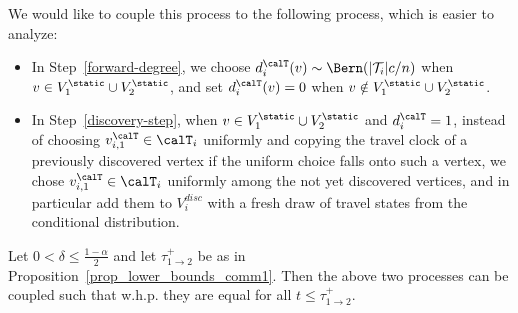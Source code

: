 \documentclass[11pt]{article}
\begin{document}
We would like to couple this process to the following process, which is easier to analyze:
\begin{itemize}
    \item In Step~\ref{forward-degree}, we choose
    $d_i^\calT(v)\sim \Bern(|\mathcal T_i|c/n)$ when $v\in V_1^\static\cup V_2^\static$, and set $d_i^\calT(v)=0$ when $v\notin V_1^\static\cup V_2^\static$.
    \item In Step~\ref{discovery-step}, when $v\in V_1^\static\cup V_2^\static$ and $d_i^\calT=1$, instead of choosing 
     $v_{i,1}^{\calT}\in \calT_i$ uniformly and copying the travel clock of a previously discovered vertex if the uniform choice falls onto such a vertex, we chose  $v_{i,1}^{\calT}\in \calT_i$ uniformly among the not yet discovered vertices, and in particular add them to $V_i^{disc}$ with a fresh draw of travel states from the conditional distribution.
\end{itemize}

\begin{lemma}\label{lem:no-conflict-coupling}
    Let $0<\delta\leq \frac{1-\alpha}2$
    and let 
    $\tau_{1\to 2}^+$ be as in Proposition~\ref{prop_lower_bounds_comm1}.
    Then the above two processes can be coupled such that w.h.p. they are equal for all $t\leq \tau_{1\to 2}^+$.
\end{lemma}
\end{document}
